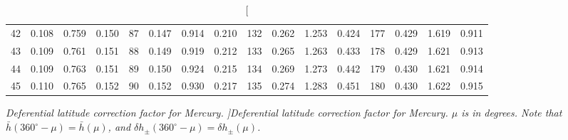 \begin{table}
{\begin{tabular}{rrrr|rrrr|rrrr|crrr}
 42 & \tiny{  0.108} &   0.759 & \tiny{  0.150} &  87 & \tiny{  0.147} &   0.914 & \tiny{  0.210} & 132 & \tiny{  0.262} &   1.253 & \tiny{  0.424} & 177 & \tiny{  0.429} &   1.619 & \tiny{  0.911}\\
 43 & \tiny{  0.109} &   0.761 & \tiny{  0.151} &  88 & \tiny{  0.149} &   0.919 & \tiny{  0.212} & 133 & \tiny{  0.265} &   1.263 & \tiny{  0.433} & 178 & \tiny{  0.429} &   1.621 & \tiny{  0.913}\\
 44 & \tiny{  0.109} &   0.763 & \tiny{  0.151} &  89 & \tiny{  0.150} &   0.924 & \tiny{  0.215} & 134 & \tiny{  0.269} &   1.273 & \tiny{  0.442} & 179 & \tiny{  0.430} &   1.621 & \tiny{  0.914}\\
 45 & \tiny{  0.110} &   0.765 & \tiny{  0.152} &  90 & \tiny{  0.152} &   0.930 & \tiny{  0.217} & 135 & \tiny{  0.274} &   1.283 & \tiny{  0.451} & 180 & \tiny{  0.430} &   1.622 & \tiny{  0.915}\\
\end{tabular}}
\caption[\em  Deferential latitude correction factor for Mercury. ]{\em Deferential latitude correction factor for Mercury. $\mu$ is in degrees. Note that $\bar{h}(360^\circ-\mu) = \bar{h}(\mu)$, and $\delta h_{\pm}(360^\circ-\mu) = \delta h_{\pm}(\mu)$. }\label{tlat2mc}
\end{table}


